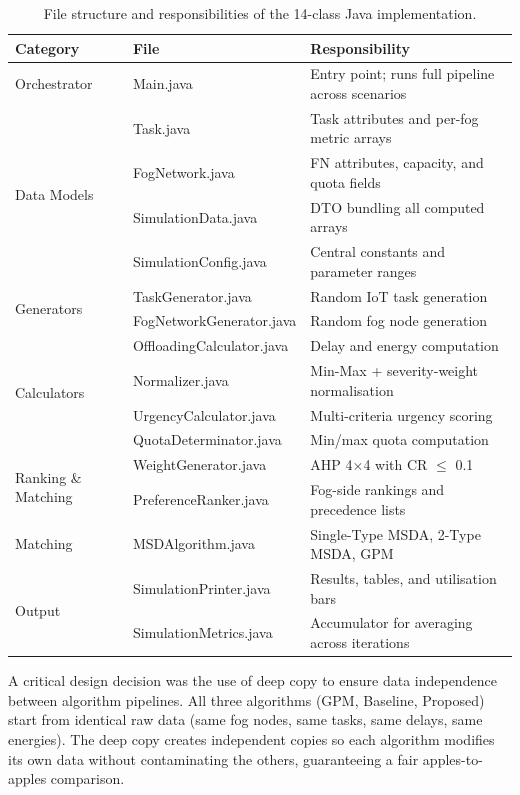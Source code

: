 \begin{table}[htbp]
\centering
\begin{tabular}{|l|l|l|}
\hline
\textbf{Category} & \textbf{File} & \textbf{Responsibility} \\
\hline
Orchestrator & Main.java & Entry point; runs full pipeline across scenarios \\
\hline
\multirow{4}{*}{Data Models} & Task.java & Task attributes and per-fog metric arrays \\
 & FogNetwork.java & FN attributes, capacity, and quota fields \\
 & SimulationData.java & DTO bundling all computed arrays \\
 & SimulationConfig.java & Central constants and parameter ranges \\
\hline
\multirow{2}{*}{Generators} & TaskGenerator.java & Random IoT task generation \\
 & FogNetworkGenerator.java & Random fog node generation \\
\hline
\multirow{4}{*}{Calculators} & OffloadingCalculator.java & Delay and energy computation \\
 & Normalizer.java & Min-Max + severity-weight normalisation \\
 & UrgencyCalculator.java & Multi-criteria urgency scoring \\
 & QuotaDeterminator.java & Min/max quota computation \\
\hline
\multirow{2}{*}{Ranking \& Matching} & WeightGenerator.java & AHP 4$\times$4 with CR $\leq$ 0.1 \\
 & PreferenceRanker.java & Fog-side rankings and precedence lists \\
\hline
Matching & MSDAlgorithm.java & Single-Type MSDA, 2-Type MSDA, GPM \\
\hline
\multirow{2}{*}{Output} & SimulationPrinter.java & Results, tables, and utilisation bars \\
 & SimulationMetrics.java & Accumulator for averaging across iterations \\
\hline
\end{tabular}
\caption{File structure and responsibilities of the 14-class Java implementation.}
\label{tab:file_structure}
\end{table}

A critical design decision was the use of deep copy to ensure data independence between algorithm pipelines. All three algorithms (GPM, Baseline, Proposed) start from identical raw data (same fog nodes, same tasks, same delays, same energies). The deep copy creates independent copies so each algorithm modifies its own data without contaminating the others, guaranteeing a fair apples-to-apples comparison.


